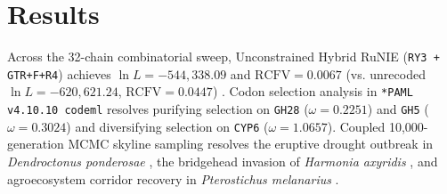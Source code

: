 \documentclass[10pt,letterpaper]{article}
\begin{document}
\section{Results}
Across the 32-chain combinatorial sweep, Unconstrained Hybrid RuNIE (\texttt{RY3 + GTR+F+R4}) achieves $\ln L = -544,338.09$ and $\text{RCFV} = 0.0067$ (vs. unrecoded $\ln L = -620,621.24$, $\text{RCFV} = 0.0447$) \cite{Katoh2013,Minh2020,To2016,Phillips2004}. Codon selection analysis in \texttt{*PAML v4.10.10 codeml} \cite{Yang2007} resolves purifying selection on \texttt{GH28} ($\omega = 0.2251$) and \texttt{GH5} ($\omega = 0.3024$) and diversifying selection on \texttt{CYP6} ($\omega = 1.0657$). Coupled 10,000-generation MCMC skyline sampling resolves the eruptive drought outbreak in \emph{Dendroctonus ponderosae} \cite{Keeling2013,Janes2014}, the bridgehead invasion of \emph{Harmonia axyridis} \cite{Lombaert2010,Roy2016}, and agroecosystem corridor recovery in \emph{Pterostichus melanarius} \cite{Raupach2010,Landis2000}.
\end{document}
